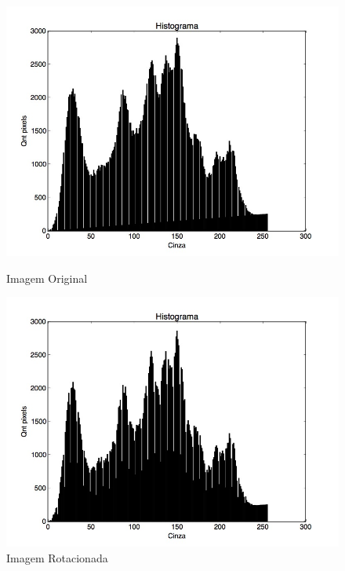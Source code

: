 \documentclass{article}
\begin{document}
\FloatBarrier
\begin{figure}[!htb]
\begin{minipage}[b]{0.45\linewidth}
\centering
\includegraphics[scale=0.25]{Histo_lena_B.jpg}
\caption{Imagem Original}
\label{fig:original}
\end{minipage}
\hspace{0.5cm}
\begin{minipage}[b]{0.45\linewidth}
\centering
\includegraphics[scale=0.25]{Histo_TransNaoLinearDistorcao.jpg}
\caption{Imagem Rotacionada}
\label{fig:rota}
\end{minipage}
\end{figure}
\FloatBarrier
\end{document}
